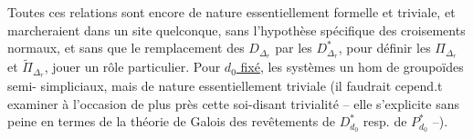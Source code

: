 Toutes ces relations sont encore de
nature essentiellement formelle et triviale,
et marcheraient dans un site quelconque,
sans l'hypothèse spécifique des croisements
normaux, et sans que le remplacement des
$D_{\Delta_r}$ par les $D^*_{\Delta_r}$, pour définir les
$\Pi_{\Delta_r}$ et $\widetilde\Pi_{\Delta_r}$, 
jouer un rôle particulier.
Pour \uline{$d_0$ fixé}, les systèmes
 un hom de groupoïdes semi-
simpliciaux, mais de nature essentiellement
triviale (il faudrait cepend.t examiner
à l'occasion de plus près cette soi-disant
trivialité --  elle s'explicite sans peine
en termes de la théorie de Galois
des revêtements de $D^*_{d_0}$ resp. de $P^*_{d_0}$ --).

